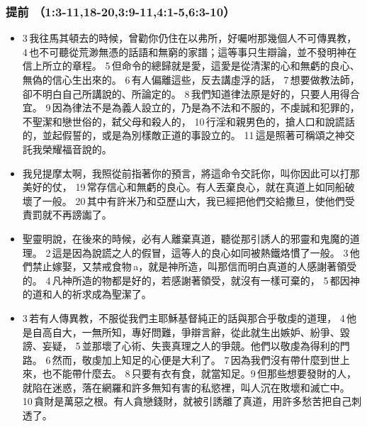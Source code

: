  
 
 \subsubsection{提前 （1:3-11,18-20,3:9-11,4:1-5,6:3-10） } 
  \begin{itemize}
 \itemsep-.25em
\item 3 我往馬其頓去的時候，曾勸你仍住在以弗所，好囑咐那幾個人不可傳異教， 4 也不可聽從荒渺無憑的話語和無窮的家譜；這等事只生辯論，並不發明神在信上所立的章程。 5 但命令的總歸就是愛，這愛是從清潔的心和無虧的良心、無偽的信心生出來的。 6 有人偏離這些，反去講虛浮的話， 7 想要做教法師，卻不明白自己所講說的、所論定的。 8 我們知道律法原是好的，只要人用得合宜。 9 因為律法不是為義人設立的，乃是為不法和不服的，不虔誠和犯罪的，不聖潔和戀世俗的，弑父母和殺人的， 10 行淫和親男色的，搶人口和說謊話的，並起假誓的，或是為別樣敵正道的事設立的。 11 這是照著可稱頌之神交託我榮耀福音說的。
 \item  我兒提摩太啊，我照從前指著你的預言，將這命令交託你，叫你因此可以打那美好的仗， 19 常存信心和無虧的良心。有人丟棄良心，就在真道上如同船破壞了一般。 20 其中有許米乃和亞歷山大，我已經把他們交給撒旦，使他們受責罰就不再謗讟了。
  \item 聖靈明說，在後來的時候，必有人離棄真道，聽從那引誘人的邪靈和鬼魔的道理。 2 這是因為說謊之人的假冒，這等人的良心如同被熱鐵烙慣了一般。 3 他們禁止嫁娶，又禁戒食物 a，就是神所造，叫那信而明白真道的人感謝著領受的。 4 凡神所造的物都是好的，若感謝著領受，就沒有一樣可棄的， 5 都因神的道和人的祈求成為聖潔了。
 \item  3 若有人傳異教，不服從我們主耶穌基督純正的話與那合乎敬虔的道理， 4 他是自高自大，一無所知，專好問難，爭辯言辭，從此就生出嫉妒、紛爭、毀謗、妄疑， 5 並那壞了心術、失喪真理之人的爭競。他們以敬虔為得利的門路。 6 然而，敬虔加上知足的心便是大利了。 7 因為我們沒有帶什麼到世上來，也不能帶什麼去。 8 只要有衣有食，就當知足。9 但那些想要發財的人，就陷在迷惑，落在網羅和許多無知有害的私慾裡，叫人沉在敗壞和滅亡中。 10 貪財是萬惡之根。有人貪戀錢財，就被引誘離了真道，用許多愁苦把自己刺透了。
 \end{itemize}
 
 
 
 
 
 
   
